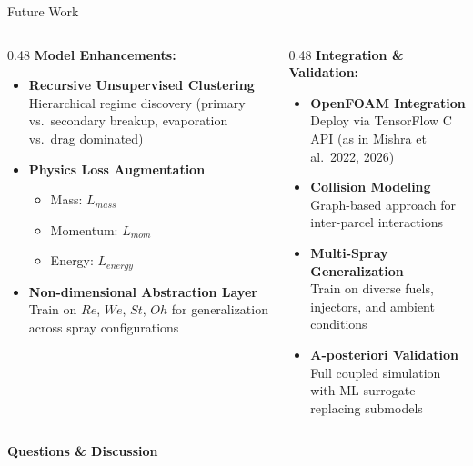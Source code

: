 \documentclass[aspectratio=169]{beamer}
\begin{document}
\begin{frame}{Future Work}
\begin{columns}[T]
\begin{column}{0.48\textwidth}
\textbf{Model Enhancements:}
\begin{itemize}[<+->]
    \item \textbf{Recursive Unsupervised Clustering}\\Hierarchical regime discovery (primary vs.\ secondary breakup, evaporation vs.\ drag dominated)
    \item \textbf{Physics Loss Augmentation}
    \begin{itemize}
        \item Mass: $L_{mass}$
        \item Momentum: $L_{mom}$
        \item Energy: $L_{energy}$
    \end{itemize}
    \item \textbf{Non-dimensional Abstraction Layer}\\Train on $Re$, $We$, $St$, $Oh$ for generalization across spray configurations
\end{itemize}
\end{column}
\begin{column}{0.48\textwidth}
\pause
\textbf{Integration \& Validation:}
\begin{itemize}[<+->]
    \item \textbf{OpenFOAM Integration}\\Deploy via TensorFlow C API (as in Mishra et al.\ 2022, 2026)
    \item \textbf{Collision Modeling}\\Graph-based approach for inter-parcel interactions
    \item \textbf{Multi-Spray Generalization}\\Train on diverse fuels, injectors, and ambient conditions
    \item \textbf{A-posteriori Validation}\\Full coupled simulation with ML surrogate replacing submodels
\end{itemize}
\end{column}
\end{columns}
\end{frame}

\begin{frame}{}
\vfill
\begin{center}
{\Huge\textbf{Questions \& Discussion}}
\end{center}
\vfill
\end{frame}
\end{document}

